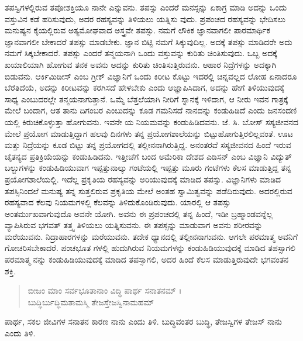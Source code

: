 ತಪಸ್ವಿಗಳಲ್ಲಿರುವ ತಪೋಶಕ್ತಿಯೂ ನಾನೇ ಎನ್ನುವನು. ತಪಸ್ಸು ಎಂದರೆ ಮನಸ್ಸನ್ನು ಏಕಾಗ್ರ ಮಾಡಿ ಅದನ್ನು ಒಂದು ವಸ್ತುವಿನ ಕಡೆ ಹರಿಸುವುದು, ಅದರ ರಹಸ್ಯವನ್ನು ತಿಳಿಯಲು ಯತ್ನಿಸು ವುದು. ಪ್ರಪಂಚದ ರಹಸ್ಯವನ್ನು ಭೇದಿಸಲು ಮನುಷ್ಯನ ಕೈಯಲ್ಲಿರುವ ಅತ್ಯಮೋಘವಾದ ಅಸ್ತ್ರವೇ ತಪಸ್ಸು. ನಮಗೆ ಲೌಕಿಕ ಜ್ಞಾನವಾಗಲೀ ಪಾರಮಾರ್ಥಿಕ ಜ್ಞಾನವಾಗಲೀ ಬೇಕಾದರೆ ತಪಸ್ಸು ಮಾಡಬೇಕು. ಜ್ಞಾನ ಬಿಟ್ಟಿ ನಮಗೆ ಸಿಕ್ಕುವುದಿಲ್ಲ. ಅದಕ್ಕೆ ತಪಸ್ಸು ಮಾಡಿದರೇ ಅದು ನಮಗೆ ಸಿಕ್ಕಬೇಕಾದರೆ. ತಪಸ್ಸು ಎಂದರೆ ತನ್ಮಯನಾಗಿ ಒಂದು ವಸ್ತುವನ್ನು ಕುರಿತು ಚಿಂತಿಸುವುದು. ಒಬ್ಬ ಅದಕ್ಕೆ ಖಯಾಲಿಯಾಗಿ ಹೋಗುವ ತನಕ ಅವನು ಅದನ್ನು ಕುರಿತು ಚಿಂತಿಸುತ್ತಿರುವನು. ಆಹಾರ ನಿದ್ರೆಗಳನ್ನು ಅದಕ್ಕಾಗಿ ಬಿಡುವನು. ಆರ್ಕಿಮಿಡೀಸ್ ಎಂಬ ಗ್ರೀಕ್ ವಿಜ್ಞಾನಿಗೆ ಒಂದು ಕಿರೀಟ ಕೊಟ್ಟು ಇದರಲ್ಲಿ ಚಿನ್ನವಲ್ಲದ ಲೋಹ ಏನಾದರೂ ಬೆರೆತಿದೆಯೆ, ಅದನ್ನು ಕಿರೀಟವನ್ನು ಕರಗಿಸದೆ ಹೇಳಬೇಕು ಎಂದು ಆಜ್ಞಾಪಿಸಿದಾಗ, ಅದನ್ನು ಹೇಗೆ ತಿಳಿಯುವುದಕ್ಕೆ ಸಾಧ್ಯ ಎಂಬುದರಲ್ಲೇ ತನ್ಮಯನಾಗುತ್ತಾನೆ. ಒಮ್ಮೆ ಬೆತ್ತಲೆಯಾಗಿ ನೀರಿಗೆ ಸ್ನಾನಕ್ಕೆ ಇಳಿದಾಗ, ಆ ನೀರು ಇವನ ಗಾತ್ರಕ್ಕೆ ಮೇಲೆ ಬಂದಾಗ, ಆತ ತಾನು ದಿಗಂಬರ ಎಂಬುದನ್ನು ಕೂಡ ಗಮನಿಸದೆ ನಾನದನ್ನು ಕಂಡುಹಿಡಿದೆ ಎಂದು ಜನಸಂದಣಿ ಯಲ್ಲಿ ಕಿರುಚಿಕೊಳ್ಳುತ್ತಾ ಹೋಗುವನು. ಇವನೇ ಯ ನಿಯಮವನ್ನು ಕಂಡುಹಿಡಿದವನು. ಜೆ. ಸಿ. ಬೋಸ್ ಸಸ್ಯಜೀವನದ ಮೇಲೆ ಪ್ರಯೋಗ ಮಾಡುತ್ತಿದ್ದಾಗ ಹಲವು ದಿನಗಳು ತನ್ನ ಪ್ರಯೋಗಶಾಲೆಯನ್ನು ಬಿಟ್ಟುಹೋಗುತ್ತಿರಲಿಲ್ಲವಂತೆ. ಊಟ ಮತ್ತು ನಿದ್ರೆಯನ್ನು ಕೂಡ ಬಿಟ್ಟು ತನ್ನ ಪ್ರಯೋಗದಲ್ಲಿ ತಲ್ಲೀನನಾಗಿರುತ್ತಿದ್ದ. ಅನಂತರವೆ ಸಸ್ಯಜೀವನದ ಹಿಂದೆ ಇರುವ ಚೈತನ್ಯದ ಪ್ರತಿಕ್ರಿಯೆಯನ್ನು ಕಂಡುಹಿಡಿದನು. ಇತ್ತೀಚೆಗೆ ಬಂದ ಅಮೆರಿಕಾ ದೇಶದ ಎಡಿಸನ್ ಎಂಬ ವಿಜ್ಞಾನಿ ವಿದ್ಯುತ್ ಬಲ್ಬುಗಳನ್ನು ಕಂಡುಹಿಡಿಯುವಾಗ ಇಪ್ಪತ್ತುನಾಲ್ಕು ಗಂಟೆಯಲ್ಲಿ ಇಪ್ಪತ್ತು ಮೂರು ಗಂಟೆಗಳು ಕೆಲಸ ಮಾಡುತ್ತಿದ್ದ ತನ್ನ ಪ್ರಯೋಗಶಾಲೆಯಲ್ಲಿ. ಇದೆಲ್ಲ ಪ್ರಕೃತಿಯ ರಹಸ್ಯವನ್ನು ಅರಿಯುವುದಕ್ಕೆ ಮಾಡಿದ ತಪಸ್ಸು. ವಿಜ್ಞಾನಿಗಳು ಮಾಡಿದ ತಪಸ್ಸಿನಿಂದಲೆ ಮನುಷ್ಯ ತನ್ನ ಸುತ್ತಲಿರುವ ಪ್ರಕೃತಿಯ ಮೇಲೆ ಅಂತಹ ಸ್ವಾಮಿತ್ವವನ್ನು ಪಡೆದಿರುವುದು. ಅದರಲ್ಲಿರುವ ರಹಸ್ಯವಾದ ಕೆಲವು ನಿಯಮಗಳಲ್ಲಿ ಕೆಲವನ್ನು ತಿಳಿದುಕೊಂಡಿರುವುದು. ಯಾರಲ್ಲಿ ಆ ತಪಸ್ಸು ಅಂತರ್ಮುಖವಾಗುವುದೊ ಅವನೇ ಯೋಗಿ. ಅವನು ಈ ಪ್ರಪಂಚದಲ್ಲಿ ತನ್ನ ಹಿಂದೆ, ಇಡೀ ಬ್ರಹ್ಮಾಂಡವನ್ನೆಲ್ಲ ವ್ಯಾಪಿಸಿರುವ ಭಗವತ್ ತತ್ತ್ವ ತಿಳಿಯಲು ಯತ್ನಿಸುವನು. ಈ ತಪಸ್ಸನ್ನು ಮಾಡುವಾಗ ಅವನು ಶರೀರವನ್ನು ಮರೆಯುವನು. ನಿದ್ರಾಹಾರಗಳನ್ನು ಮರೆಯುವನು. ತದೇಕ ಧ್ಯಾನದಲ್ಲಿ ತಲ್ಲೀನನಾಗುವನು. ಆಗಲೇ ಪರಮಾತ್ಮ ಅವನಿಗೆ ಗೋಚರಿಸಬೇಕಾದರೆ. ಪಂಚಭೂತ ಗಳಲ್ಲಿ ಹುದುಗಿರುವ ನಿಯಮಗಳನ್ನು ಕಂಡುಹಿಡಿಯುವುದಕ್ಕೆ ಮಾಡಿದ ತಪಸ್ಸಾಗಲಿ ಪರಮಾತ್ಮ ನನ್ನು ಕಂಡುಹಿಡಿಯುವುದಕ್ಕೆ ಮಾಡಿದ ತಪಸ್ಸಾಗಲಿ, ಅದರ ಹಿಂದೆ ಕೆಲಸ ಮಾಡುತ್ತಿರುವುದೇ ಭಗವಂತನ ಶಕ್ತಿ.

\begin{verse}
ಬೀಜಂ ಮಾಂ ಸರ್ವಭೂತಾನಾಂ ವಿದ್ಧಿ ಪಾರ್ಥ ಸನಾತನಮ್ ।\\ಬುದ್ಧಿರ್ಬುದ್ಧಿಮತಾಮಸ್ಮಿ ತೇಜಸ್ತೇಜಸ್ವಿನಾಮಹಮ್ 
\end{verse}

{\small ಪಾರ್ಥ, ಸಕಲ ಜೀವಿಗಳ ಸನಾತನ ಕಾರಣ ನಾನು ಎಂದು ತಿಳಿ. ಬುದ್ಧಿವಂತರ ಬುದ್ಧಿ, ತೇಜಸ್ವಿಗಳ ತೇಜಸ್ ನಾನು ಎಂದು ತಿಳಿ.}

